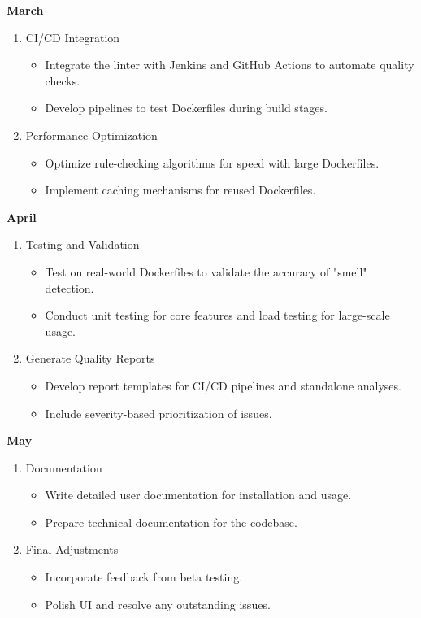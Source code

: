 \textbf{March}
\begin{enumerate}
    \item CI/CD Integration
    \begin{itemize}
        \item Integrate the linter with Jenkins and GitHub Actions to automate quality checks.
        \item Develop pipelines to test Dockerfiles during build stages.
    \end{itemize}
    \item Performance Optimization
    \begin{itemize}
        \item Optimize rule-checking algorithms for speed with large Dockerfiles.
        \item Implement caching mechanisms for reused Dockerfiles.
    \end{itemize}
\end{enumerate}

\textbf{April}
\begin{enumerate}
    \item Testing and Validation
    \begin{itemize}
        \item Test on real-world Dockerfiles to validate the accuracy of "smell" detection.
        \item Conduct unit testing for core features and load testing for large-scale usage.
    \end{itemize}
    \item Generate Quality Reports
    \begin{itemize}
        \item Develop report templates for CI/CD pipelines and standalone analyses.
        \item Include severity-based prioritization of issues.
    \end{itemize}
\end{enumerate}

\textbf{May}
\begin{enumerate}
    \item Documentation
    \begin{itemize}
        \item Write detailed user documentation for installation and usage.
        \item Prepare technical documentation for the codebase.
    \end{itemize}
    \item Final Adjustments
    \begin{itemize}
        \item Incorporate feedback from beta testing.
        \item Polish UI and resolve any outstanding issues.
    \end{itemize}
\end{enumerate}

